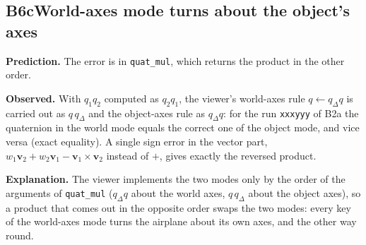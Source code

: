 \documentclass[10pt,a4paper]{article}
\newcommand{\experiment}[5]{%
  \subsection*{#1\quad #2}
  \textbf{Prediction.} #3\par
  \textbf{Observed.} #4\par
  \textbf{Explanation.} #5\par
}
\begin{document}
\experiment{B6c}{World-axes mode turns about the object's axes}
  {The error is in \texttt{quat\_mul}, which returns the product in the other order.}
  {With $q_1q_2$ computed as $q_2q_1$, the viewer's world-axes rule $q\leftarrow q_\Delta q$ is carried out as
   $q\,q_\Delta$ and the object-axes rule as $q_\Delta q$: for the run \texttt{xxxyyy} of B2a the quaternion in the
   world mode equals the correct one of the object mode, and vice versa (exact equality). A single sign error in
   the vector part, $w_1\mathbf v_2+w_2\mathbf v_1-\mathbf v_1\times\mathbf v_2$ instead of $+$, gives exactly the reversed
   product.}
  {The viewer implements the two modes only by the order of the arguments of \texttt{quat\_mul}
   ($q_\Delta q$ about the world axes, $q\,q_\Delta$ about the object axes), so a product that comes out in the
   opposite order swaps the two modes: every key of the world-axes mode turns the airplane about its own axes, and
   the other way round.}
\end{document}
